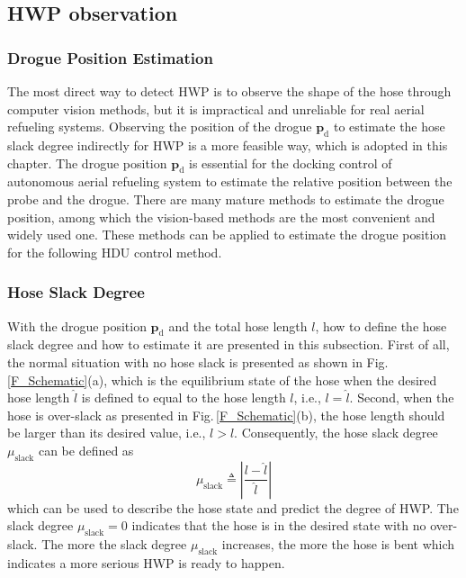 \subsection{HWP observation}

\subsubsection{Drogue Position Estimation}

The most direct way to detect HWP is to observe the shape of the hose
through computer vision methods, but it is impractical and unreliable
for real aerial refueling systems. Observing the position of the drogue
$\mathbf{p}_\text{d}$ to estimate the hose slack degree indirectly
for HWP is a more feasible way, which is adopted in this chapter. The
drogue position $\mathbf{p}_\text{d}$ is essential for the docking
control of autonomous aerial refueling system to estimate the relative
position between the probe and the drogue. There are many mature methods
to estimate the drogue position, among which the vision-based methods
\cite{Dibley2007PhaseI,Tandale2008Trajectory} are the
most convenient and widely used one. These methods can be applied to estimate the drogue position for the following HDU control method.


\subsubsection{Hose Slack Degree}

With the drogue position $\mathbf{p}_\text{d}$ and the total hose
length $l$, how to define the hose slack degree and how to estimate
it are presented in this subsection. First of all, the normal situation
with no hose slack is presented as shown in Fig.\,\ref{F_Schematic}(a),
which is the equilibrium state of the hose when the desired hose length
$\hat{l}$ is defined to equal to the hose length $l$, i.e., $l=\hat{l}$.
Second, when the hose is over-slack as presented in Fig.\,\ref{F_Schematic}(b),
the hose length should be larger than its desired value, i.e., $l>\hat{l}$.
Consequently, the hose slack degree $\mu_\text{slack}$ can be defined
as
\begin{equation}
\mu_\text{slack}\triangleq\left|\frac{l-\hat{l}}{\hat{l}}\right|\label{eq:SlackDegree}
\end{equation}
which can be used to describe the hose state and predict the degree
of HWP. The slack degree $\mu_\text{slack}=0$ indicates that the hose
is in the desired state with no over-slack. The more the slack degree
$\mu_\text{slack}$ increases, the more the hose is bent which indicates
a more serious HWP is ready to happen.

